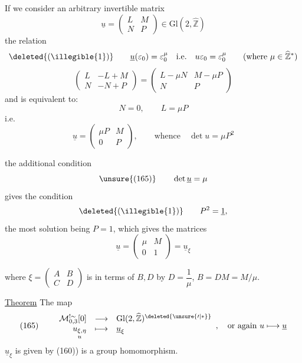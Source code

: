 If we consider an arbitrary invertible matrix
\[
\underline u=\begin{pmatrix}L&M\\N&P\end{pmatrix}
\in\mathrm{Gl}(2,\widehat{\mathbb Z})
\]
the relation
\[
\deleted{(\illegible{1})}\qquad
\underline u(\varepsilon_0)=\varepsilon_0^\mu
\quad\text{i.e.}\quad
u\varepsilon_0=\varepsilon_0^\mu
\qquad(\text{where }\mu\in\widehat{\mathbb Z}^{*})
\]
\[
\begin{pmatrix}L&-L+M\\N&-N+P\end{pmatrix}
=\begin{pmatrix}L-\mu N&M-\mu P\\N&P\end{pmatrix}
\]
and is equivalent to: 
\[
N=0,\qquad L=\mu P
\]
i.e.
\[
\underline u=\begin{pmatrix}\mu P&M\\0&P\end{pmatrix},
\qquad\text{whence}\quad\det u=\mu P^2
\]

the additional condition
\[
\unsure{(165)}\qquad \det\underline u=\mu
\]
gives the condition
\[
\deleted{(\illegible{1})}\qquad P^2=\underline 1,
\]
the most  solution being $P=1$,
which gives  the matrices
\[
\underline u=\begin{pmatrix}\mu&M\\0&1\end{pmatrix}
=\underline u_\xi
\]


where $\xi=\begin{pmatrix}A&B\\C&D\end{pmatrix}$
 is  in terms of
$B,D$ by $D=\dfrac1\mu$, $B=DM=M/\mu$.

\uline{Theorem} The map
\[
(165)\qquad
\begin{array}{rcl}
\mathcal M_{0,3}^{!\sim}[0]&\longrightarrow&
\mathrm{Gl}(2,\widehat{\mathbb Z})^{\deleted{\unsure{\prime|*}}}\\
\underset{u}{u_{\xi,\eta}}&\longmapsto&\underline u_\xi
\end{array},
\quad\text{or again }u\longmapsto\underline u
\]
$\underline u_\xi$ is given by (160)) is a group homomorphism.


